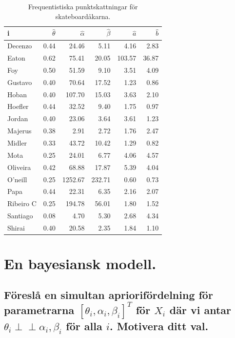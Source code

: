 \documentclass{article}
\newcommand{\independent}{\perp\!\!\!\!\perp}
\begin{document}
\begin{table}[t]
    \centering
    \caption{Frequentistiska punktskattningar för skateboardåkarna.}
    \label{tab:freq_params}
    \begin{tabular}{lrrrrr}
        \toprule
        i & $\hat{\theta}$ & $\hat{\alpha}$ & $\hat{\beta}$ & $\hat{a}$ & $\hat{b}$ \\
        \midrule
        Decenzo   & 0.44 & 24.46 & 5.11 & 4.16 & 2.83 \\
        Eaton     & 0.62 & 75.41 & 20.05 & 103.57 & 36.87 \\
        Foy       & 0.50 & 51.59 & 9.10 & 3.51 & 4.09 \\
        Gustavo   & 0.40 & 70.64 & 17.52 & 1.23 & 0.86 \\
        Hoban     & 0.40 & 107.70 & 15.03 & 3.63 & 2.10 \\
        Hoefler   & 0.44 & 32.52 & 9.40 & 1.75 & 0.97 \\
        Jordan    & 0.40 & 23.06 & 3.64 & 3.61 & 1.23 \\
        Majerus   & 0.38 & 2.91 & 2.72 & 1.76 & 2.47 \\
        Midler    & 0.33 & 43.72 & 10.42 & 1.29 & 0.82 \\
        Mota      & 0.25 & 24.01 & 6.77 & 4.06 & 4.57 \\
        Oliveira  & 0.42 & 68.88 & 17.87 & 5.39 & 4.04 \\
        O'neill   & 0.25 & 1252.67 & 232.71 & 0.60 & 0.73 \\
        Papa      & 0.44 & 22.31 & 6.35 & 2.16 & 2.07 \\
        Ribeiro C & 0.25 & 194.78 & 56.01 & 1.80 & 1.52 \\
        Santiago  & 0.08 & 4.70 & 5.30 & 2.68 & 4.34 \\
        Shirai    & 0.40 & 20.58 & 2.35 & 1.84 & 1.10 \\
        \bottomrule
    \end{tabular}
\end{table}

\newpage
\section{En bayesiansk modell.}

\subsection{Föreslå en simultan apriorifördelning för parametrarna $[\theta_i, \alpha_i, \beta_i]^T$ för $X_i$ där vi antar $\theta_i \independent \alpha_i, \beta_i$ för alla $i$. Motivera ditt val.}
\end{document}
